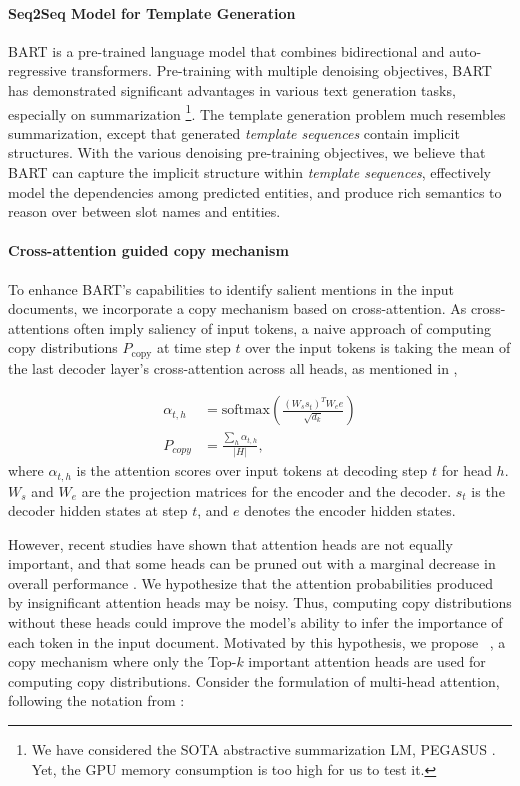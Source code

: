 \documentclass[11pt]{article}
\begin{document}
\paragraph{Seq2Seq Model for Template Generation}
BART \cite{lewis-etal-2020-bart} is a pre-trained language model that combines bidirectional and auto-regressive transformers. Pre-training with multiple denoising objectives, BART has demonstrated significant advantages in various text generation tasks, especially on summarization \cite{lewis-etal-2020-bart}\footnote{We have considered the SOTA abstractive summarization LM, PEGASUS \cite{zhang2019pegasus}. Yet, the GPU memory consumption is too high for us to test it.}. The template generation problem much resembles summarization, except that generated \textit{template sequences} contain implicit structures. With the various denoising pre-training objectives, we believe that \textsc{BART} can capture the implicit structure within \textit{template sequences}, effectively model the dependencies among predicted entities, and produce rich semantics to reason over between slot names and entities. 

\paragraph{Cross-attention guided copy mechanism}
To enhance \textsc{BART}'s capabilities to identify salient mentions in the input documents, we incorporate a copy mechanism based on cross-attention. As cross-attentions often imply saliency of input tokens, a naive approach of computing copy distributions $P_{\text{copy}}$ at time step $t$ over the input tokens is taking the mean of the last decoder layer's cross-attention across all heads, as mentioned in \citet{xu-etal-2020-self},

{
\vspace{-4mm}
\small
\begin{align}
     \alpha_{t, h} &=  \text{softmax}(\frac{(W_ss_t)^TW_ee}{\sqrt{d_k}}) \\
     P_{copy} &= \frac{\sum_{h} \alpha_{t, h} }{|H|},
\end{align}
}where $\alpha_{t, h}$ is the attention scores over input tokens at decoding step $t$ for head $h$. $W_s$ and $W_e$ are the projection matrices for the encoder and the decoder. $s_t$ is the decoder hidden states at step $t$, and $e$ denotes the encoder hidden states. 

However, recent studies have shown that attention heads are not equally important, and that some heads can be pruned out with a marginal decrease in overall performance \cite{voita-etal-2019-analyzing, NEURIPS2019_2c601ad9}. We hypothesize that the attention probabilities produced by insignificant attention heads may be noisy. Thus, computing copy distributions without these heads could improve the model's ability to infer the importance of each token in the input document. Motivated by this hypothesis, we propose \topkcopy\ , a copy mechanism where only the Top-$k$ important attention heads are used for computing copy distributions. Consider the formulation of multi-head attention, following the notation from \citet{ashish-etal-2017-attention}: 
\end{document}
